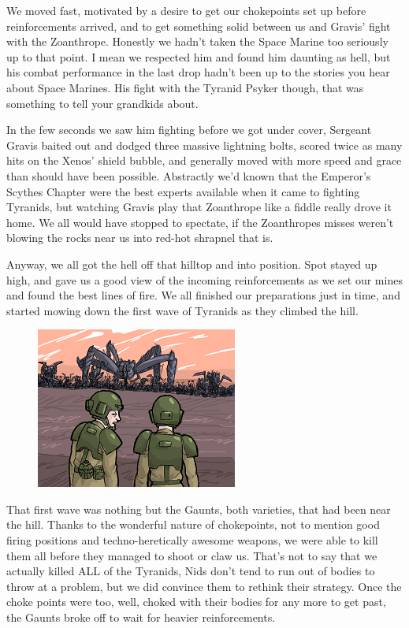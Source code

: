 We moved fast, motivated by a desire to get our chokepoints set up before reinforcements arrived, and to get something solid between us and Gravis' fight with the Zoanthrope. 
Honestly we hadn't taken the Space Marine too seriously up to that point. 
I mean we respected him and found him daunting as hell, but his combat performance in the last drop hadn't been up to the stories you hear about Space Marines. 
His fight with the Tyranid Psyker though, that was something to tell your grandkids about. 


In the few seconds we saw him fighting before we got under cover, Sergeant Gravis baited out and dodged three massive lightning bolts, scored twice as many hits on the Xenos' shield bubble, and generally moved with more speed and grace than should have been possible. 
Abstractly we'd known that the Emperor's Scythes Chapter were the best experts available when it came to fighting Tyranids, but watching Gravis play that Zoanthrope like a fiddle really drove it home. 
We all would have stopped to spectate, if the Zoanthropes misses weren't blowing the rocks near us into red-hot shrapnel that is. 


Anyway, we all got the hell off that hilltop and into position. 
Spot stayed up high, and gave us a good view of the incoming reinforcements as we set our mines and found the best lines of fire. 
We all finished our preparations just in time, and started mowing down the first wave of Tyranids as they climbed the hill.
\begin{figure}
	\begin{center}
		\includegraphics[width=\figwidth]{pics/12/43.png}
	\end{center}
\end{figure}
That first wave was nothing but the Gaunts, both varieties, that had been near the hill. 
Thanks to the wonderful nature of chokepoints, not to mention good firing positions and techno-heretically awesome weapons, we were able to kill them all before they managed to shoot or claw us. 
That's not to say that we actually killed ALL of the Tyranids, Nids don't tend to run out of bodies to throw at a problem, but we did convince them to rethink their strategy. 
Once the choke points were too, well, choked with their bodies for any more to get past, the Gaunts broke off to wait for heavier reinforcements.

